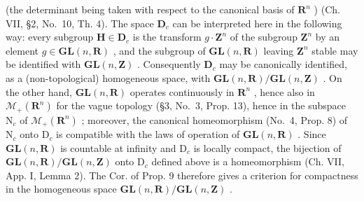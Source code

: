 (the determinant being taken with respect to the canonical basis of \(\mathbf{R}^n\) ) (Ch. VII, §2, No.~10, Th. 4). The space \(\mathbf{D}_c\) can be interpreted here in the following way: every subgroup \(\mathbf{H} \in \mathbf{D}_c\) is the transform \(g \cdot \mathbf{Z}^n\) of the subgroup \(\mathbf{Z}^n\) by an element \(g \in \mathbf{GL}(n, \mathbf{R})\) , and the subgroup of \(\mathbf{GL}(n, \mathbf{R})\) leaving \(\mathbf{Z}^n\) stable may be identified with \(\mathbf{GL}(n, \mathbf{Z})\) . Consequently \(\mathbf{D}_c\) may be canonically identified, as a (non-topological) homogeneous space, with \(\mathbf{GL}(n, \mathbf{R}) / \mathbf{GL}(n, \mathbf{Z})\) . On the other hand, \(\mathbf{GL}(n, \mathbf{R})\) operates continuously in \(\mathbf{R}^n\) , hence also in \(\mathcal{M}_{+}(\mathbf{R}^{n})\) for the vague topology (§3, No.~3, Prop. 13), hence in the subspace \(\mathrm{N}_c\) of \(\mathcal{M}_{+}(\mathbf{R}^{n})\) ; moreover, the canonical homeomorphism (No.~4, Prop. 8) of \(\mathrm{N}_c\) onto \(\mathrm{D}_c\) is compatible with the laws of operation of \(\mathbf{GL}(n, \mathbf{R})\) . Since \(\mathbf{GL}(n, \mathbf{R})\) is countable at infinity and \(\mathrm{D}_c\) is locally compact, the bijection of \(\mathbf{GL}(n, \mathbf{R}) / \mathbf{GL}(n, \mathbf{Z})\) onto \(\mathrm{D}_c\) defined above is a homeomorphism (Ch. VII, App. I, Lemma 2). The Cor. of Prop. 9 therefore gives a criterion for compactness in the homogeneous space \(\mathbf{GL}(n, \mathbf{R}) / \mathbf{GL}(n, \mathbf{Z})\) .

